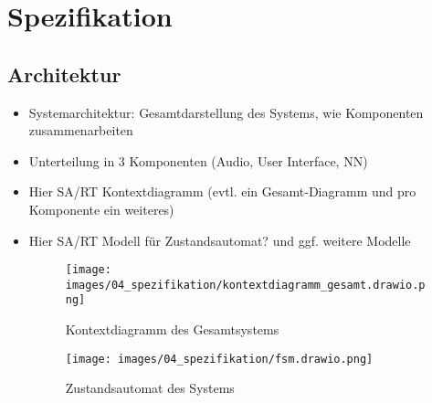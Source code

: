 \newpage
\section{Spezifikation}
\subsection{Architektur}
\begin{itemize}
    \item Systemarchitektur: Gesamtdarstellung des Systems, wie Komponenten zusammenarbeiten
    \item Unterteilung in 3 Komponenten (Audio, User Interface, NN)
    \item Hier SA/RT Kontextdiagramm (evtl. ein Gesamt-Diagramm und pro Komponente ein weiteres)
    \item Hier SA/RT Modell für Zustandsautomat? und ggf. weitere Modelle
    
    \begin{figure}[H]
    	\centering
    	\texttt{[image: images/04\_spezifikation/kontextdiagramm\_gesamt.drawio.png]}
    	\caption{Kontextdiagramm des Gesamtsystems}
    	\label{fig:context_diagram_gesamt}
    \end{figure}
    
    
   
    
    \begin{figure}[H]
    	\centering
    	\texttt{[image: images/04\_spezifikation/fsm.drawio.png]}
    	\caption{Zustandsautomat des Systems}
    	\label{fig:fsm}
    \end{figure}
\end{itemize}